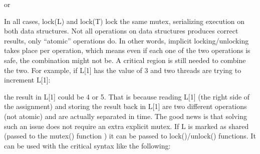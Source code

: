 or


In all cases, \textsf{lock(L)} and
\textsf{lock(T)} lock the same mutex, serializing execution
on both data structures. Not all operations on data structures produces
correct results, only {\textquotedblleft}atomic{\textquotedblright}
operations do. In other words, implicit locking/unlocking takes place
per operation, which means even if each one of the two operations is
safe, the combination might not be. A critical region is still needed
to combine the two. For example, if
\textsf{L}\textsf{[1]} has the value of 3 and two
threads are trying to increment \textsf{L[1]}:


the result in \textsf{L[1]} could be 4 or 5. That is because
reading \textsf{L[1]} (the right side of the assignment) and
storing the result back in \textsf{L[1]} are two different
operations (not atomic) and are actually separated in time. The good
news is that solving such an issue does not require an extra explicit
mutex. If \textsf{L} is marked as shared (passed to the
\textsf{mutex()} function ) it can be passed to
\textsf{lock()}/\textsf{unlock()} functions. It
can be used with the critical syntax like the following: \ 


